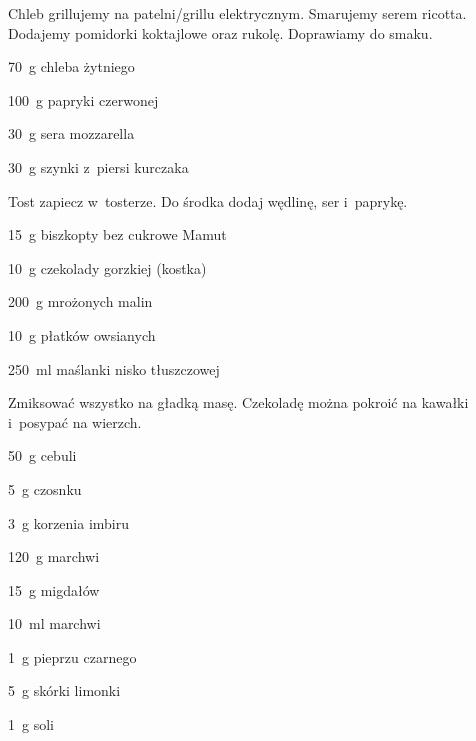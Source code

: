 \documentclass[../main.tex]{subfiles}
\begin{document}
Chleb grillujemy na patelni/grillu elektrycznym. Smarujemy serem ricotta.
Dodajemy pomidorki koktajlowe oraz rukolę. Doprawiamy do smaku.


\begin{Ingred}
    \item \qty{70}{\gram} chleba żytniego
    \item \qty{100}{\gram} papryki czerwonej
    \item \qty{30}{\gram} sera mozzarella
    \item \qty{30}{\gram} szynki z~piersi kurczaka
\end{Ingred}

Tost zapiecz w~tosterze. Do środka dodaj wędlinę, ser i~paprykę.


\begin{Ingred}
    \item \qty{15}{\gram} biszkopty bez cukrowe Mamut
    \item \qty{10}{\gram} czekolady gorzkiej (kostka)
    \item \qty{200}{\gram} mrożonych malin
    \item \qty{10}{\gram} płatków owsianych
    \item \qty{250}{\milli\litre} maślanki nisko tłuszczowej
\end{Ingred}

Zmiksować wszystko na gładką masę. Czekoladę można pokroić na kawałki i~posypać
na wierzch.


\begin{Ingred}
    \item \qty{50}{\gram} cebuli
    \item \qty{5}{\gram} czosnku
    \item \qty{3}{\gram} korzenia imbiru
    \item \qty{120}{\gram} marchwi
    \item \qty{15}{\gram} migdałów
    \item \qty{10}{\milli\litre} marchwi
    \item \qty{1}{\gram} pieprzu czarnego
    \item \qty{5}{\gram} skórki limonki
    \item \qty{1}{\gram} soli
\end{Ingred}
\end{document}
